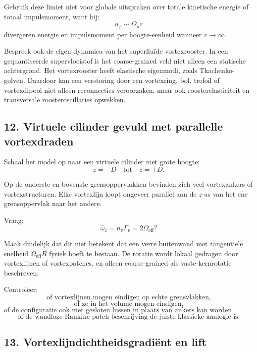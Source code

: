 \documentclass[11pt]{article}
\begin{document}
        Gebruik deze limiet niet voor globale uitspraken over totale kinetische energie of totaal impulsmoment, want bij:
        \[
            u_{\phi}\sim\Omega_{\mu}r
        \]
        divergeren energie en impulsmoment per hoogte-eenheid wanneer \(r\rightarrow\infty\).
        
        Bespreek ook de eigen dynamica van het superfluïde vortexrooster. In een gequantiseerde supervloeistof is het coarse-grained veld niet alleen een statische achtergrond. Het vortexrooster heeft elastische eigenmodi, zoals Tkachenko-golven. Daardoor kan een verstoring door een vortexring, bol, trefoil of vortexdipool niet alleen reconnecties veroorzaken, maar ook roosterelasticiteit en transversale roosteroscillaties opwekken.
    
    \subsection{12. Virtuele cilinder gevuld met parallelle vortexdraden}
        
        Schaal het model op naar een virtuele cilinder met grote hoogte:
        \[
            z=-D
            \quad\text{tot}\quad
            z=+D.
        \]
        
        Op de onderste en bovenste grensoppervlakken bevinden zich veel vortexankers of vortexstructuren. Elke vortexlijn loopt ongeveer parallel aan de \(z\)-as van het ene grensoppervlak naar het andere.
        
        Vraag:
        \[
            \bar{\omega}_z
            =
            n_v\Gamma_v
            =
            2\Omega_{\mathrm{eff}}?
        \]
        
        Maak duidelijk dat dit niet betekent dat een verre buitenwand met tangentiële snelheid \(\Omega_{\mathrm{eff}}R\) fysiek hoeft te bestaan. De rotatie wordt lokaal gedragen door vortexlijnen of vortexpatches, en alleen coarse-grained als vaste-kernrotatie beschreven.
        
        Controleer:
        \[
            \text{of vortexlijnen mogen eindigen op echte grensvlakken,}
        \]
        \[
            \text{of ze in het volume mogen eindigen,}
        \]
        \[
            \text{of de configuratie ook met gesloten lussen in plaats van ankers kan worden geformuleerd,}
        \]
        \[
            \text{of de wandloze Rankine-patch-beschrijving de juiste klassieke analogie is.}
        \]
    
    \subsection{13. Vortexlijndichtheidsgradiënt en lift}
        
\end{document}
